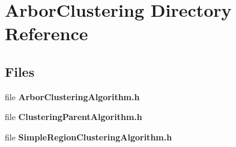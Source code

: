 \section{Arbor\+Clustering Directory Reference}
\label{dir_cebc84c61c6cba96211a72bc1695110f}
\subsection*{Files}
\begin{DoxyCompactItemize}
\item 
file {\bf Arbor\+Clustering\+Algorithm.\+h}
\item 
file {\bf Clustering\+Parent\+Algorithm.\+h}
\item 
file {\bf Simple\+Region\+Clustering\+Algorithm.\+h}
\end{DoxyCompactItemize}
